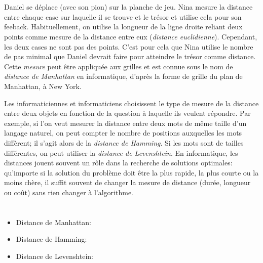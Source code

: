 {{\section*{\BrochureItsInformatics}
Daniel se déplace (avec son pion) sur la planche de jeu. Nina mesure la distance entre chaque case sur laquelle il se trouve et le trésor et utilise cela pour son feeback. Habituellement, on utilise la longueur de la ligne droite reliant deux points comme mesure de la distance entre eux (\emph{distance euclidienne}). Cependant, les deux cases ne sont pas des points. C’est pour cela que Nina utilise le nombre de pas minimal que Daniel devrait faire pour atteindre le trésor comme distance. Cette \emph{mesure} peut être appliquée aux grilles et est connue sous le nom de \emph{distance de Manhattan} en informatique, d’après la forme de grille du plan de Manhattan, à New York.

Les informaticiennes et informaticiens choisissent le type de mesure de la distance entre deux objets en fonction de la question à laquelle ils veulent répondre. Par exemple, si l’on veut mesurer la distance entre deux mots de même taille d’un langage naturel, on peut compter le nombre de positions auxquelles les mots diffèrent; il s’agit alors de la \emph{distance de Hamming}. Si les mots sont de tailles différentes, on peut utiliser la \emph{distance de Levenshtein}. En informatique, les distances jouent souvent un rôle dans la recherche de solutions optimales: qu’importe si la solution du problème doit être la plus rapide, la plus courte ou la moins chère, il suffit souvent de changer la mesure de distance (durée, longueur ou coût) sans rien changer à l’algorithme.



\section*{\BrochureWebsitesAndKeywords}
{\raggedright
\begin{itemize}
  \item Distance de Manhattan: \href{https://fr.wikipedia.org/wiki/Distance_de_Manhattan}{}
  \item Distance de Hamming: \href{https://fr.wikipedia.org/wiki/Distance_de_Hamming}{}
  \item Distance de Levenshtein: \href{https://fr.wikipedia.org/wiki/Distance_de_Levenshtein}{}
\end{itemize}


}}}
